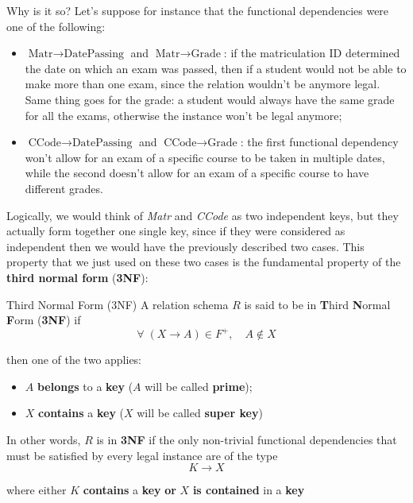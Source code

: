 Why is it so? Let's suppose for instance that the functional dependencies were one of the following:
\begin{itemize}
    \item $\text{Matr} \rightarrow \text{DatePassing}$ and $\text{Matr} \rightarrow \text{Grade}$: if the matriculation ID determined the date on which an exam was passed, then if a student would not be able to make more than one exam, since the relation wouldn't be anymore legal. Same thing goes for the grade: a student would always have the same grade for all the exams, otherwise the instance won't be legal anymore;
    \item $\text{CCode} \rightarrow \text{DatePassing}$ and $\text{CCode} \rightarrow \text{Grade}$: the first functional dependency won't allow for an exam of a specific course to be taken in multiple dates, while the second doesn't allow for an exam of a specific course to have different grades.
\end{itemize}

Logically, we would think of \textit{Matr} and \textit{CCode} as two independent keys, but they actually form together one single key, since if they were considered as independent then we would have the previously described two cases. This property that we just used on these two cases is the fundamental property of the \textbf{third normal form} (\textbf{3NF}):

\begin{definition}{Third Normal Form (3NF)}
    A relation schema $R$ is said to be in \textbf{T}hird \textbf{N}ormal \textbf{F}orm (\textbf{3NF}) if 
    \[ \forall \; (X \rightarrow A) \in F^+, \quad A \notin X \]

    then one of the two applies:
    \begin{itemize}
        \item $A$ \textbf{belongs} to a \textbf{key} ($A$ will be called \textbf{prime});
        \item $X$ \textbf{contains} a \textbf{key} ($X$ will be called \textbf{super key})
    \end{itemize}
    
    In other words, $R$ is in \textbf{3NF} if the only non-trivial functional dependencies that must be satisfied by every legal instance are of the type
    \[ K \rightarrow X \]

    where either $K$ \textbf{contains} a \textbf{key} \textbf{or} $X$ \textbf{is contained} in a \textbf{key}
\end{definition}